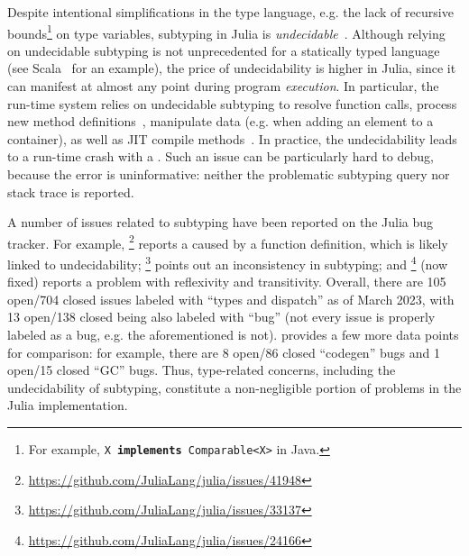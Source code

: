 Despite intentional simplifications in the type language,
e.g. the lack of recursive bounds\footnote{
  For example, \texttt{X \textbf{implements} Comparable<X>} in Java. 
} on type variables,
subtyping in Julia is
\emph{undecidable}~\cite{bib:chung:type-julia-thesis:2023}.
Although relying on undecidable subtyping is not unprecedented
for a statically typed language (see Scala~\cite{bib:hu:dot-undec:2020}
for an example),
the price of undecidability
is higher in Julia, since it
can manifest at almost any point during program \emph{execution}.
In particular, the run-time system relies on undecidable subtyping
to resolve function calls,
process new method definitions~\cite{bib:belyakova:world-age:oopsla:2020},
manipulate data (e.g. when adding an element to a container),
as well as JIT compile methods~\cite{bib:pelenitsyn:type-stability:oopsla:2021}.
In practice, the undecidability
leads to a run-time crash with a .
Such an issue can be particularly hard to debug,
because the error is uninformative: neither the problematic subtyping query
nor stack trace is reported.

A number of issues related to subtyping have been reported
on the Julia bug tracker. For example,
\href{https://github.com/JuliaLang/julia/issues/41948}{}\footnote{
    \url{https://github.com/JuliaLang/julia/issues/41948}
} reports a  caused by a function definition,
which is likely linked to undecidability;
\href{https://github.com/JuliaLang/julia/issues/33137}{}\footnote{
    \url{https://github.com/JuliaLang/julia/issues/33137}
} points out an inconsistency in subtyping; and %
\href{https://github.com/JuliaLang/julia/issues/24166}{}\footnote{
    \url{https://github.com/JuliaLang/julia/issues/24166} 
} (now fixed) reports a problem with reflexivity and transitivity.
Overall, there are 105 open/704 closed issues labeled with ``types and
dispatch'' as of March 2023,
with 13 open/138 closed being also labeled with ``bug''
(not every issue is properly labeled as a bug,
e.g. the aforementioned
\href{https://github.com/JuliaLang/julia/issues/24166}{} is not).
 provides a few more data points for comparison:
for example, there are 8 open/86 closed ``codegen'' bugs
and 1 open/15 closed ``GC'' bugs.
Thus, type-related concerns, including the undecidability of subtyping,
constitute a non-negligible portion of problems in the Julia implementation.

